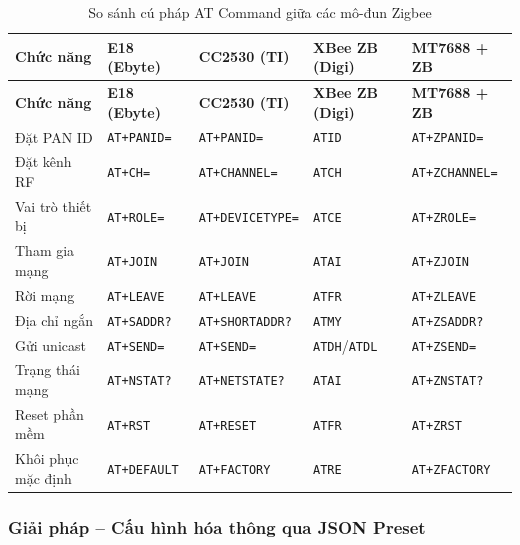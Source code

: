         \begin{longtable}{|p{}|p{}|p{}|p{}|p{}|}
            \caption{So sánh cú pháp AT Command giữa các mô-đun Zigbee}
            \label{tab:zigbee_at} \\
            \hline
            \textbf{Chức năng} & \textbf{E18 (Ebyte)} & \textbf{CC2530 (TI)} & \textbf{XBee ZB (Digi)} & \textbf{MT7688 + ZB} \\ \hline
            \endfirsthead
            \hline
            \textbf{Chức năng} & \textbf{E18 (Ebyte)} & \textbf{CC2530 (TI)} & \textbf{XBee ZB (Digi)} & \textbf{MT7688 + ZB} \\ \hline
            \endhead
            Đặt PAN ID & \texttt{AT+PANID=} & \texttt{AT+PANID=} & \texttt{ATID} & \texttt{AT+ZPANID=} \\ \hline
            Đặt kênh RF & \texttt{AT+CH=} & \texttt{AT+CHANNEL=} & \texttt{ATCH} & \texttt{AT+ZCHANNEL=} \\ \hline
            Vai trò thiết bị & \texttt{AT+ROLE=} & \texttt{AT+DEVICETYPE=} & \texttt{ATCE} & \texttt{AT+ZROLE=} \\ \hline
            Tham gia mạng & \texttt{AT+JOIN} & \texttt{AT+JOIN} & \texttt{ATAI} & \texttt{AT+ZJOIN} \\ \hline
            Rời mạng & \texttt{AT+LEAVE} & \texttt{AT+LEAVE} & \texttt{ATFR} & \texttt{AT+ZLEAVE} \\ \hline
            Địa chỉ ngắn & \texttt{AT+SADDR?} & \texttt{AT+SHORTADDR?} & \texttt{ATMY} & \texttt{AT+ZSADDR?} \\ \hline
            Gửi unicast & \texttt{AT+SEND=} & \texttt{AT+SEND=} & \texttt{ATDH}/\texttt{ATDL} & \texttt{AT+ZSEND=} \\ \hline
            Trạng thái mạng & \texttt{AT+NSTAT?} & \texttt{AT+NETSTATE?} & \texttt{ATAI} & \texttt{AT+ZNSTAT?} \\ \hline
            Reset phần mềm & \texttt{AT+RST} & \texttt{AT+RESET} & \texttt{ATFR} & \texttt{AT+ZRST} \\ \hline
            Khôi phục mặc định & \texttt{AT+DEFAULT} & \texttt{AT+FACTORY} & \texttt{ATRE} & \texttt{AT+ZFACTORY} \\ \hline
        \end{longtable}
        
        \subsubsection{Giải pháp -- Cấu hình hóa thông qua JSON Preset}
        
